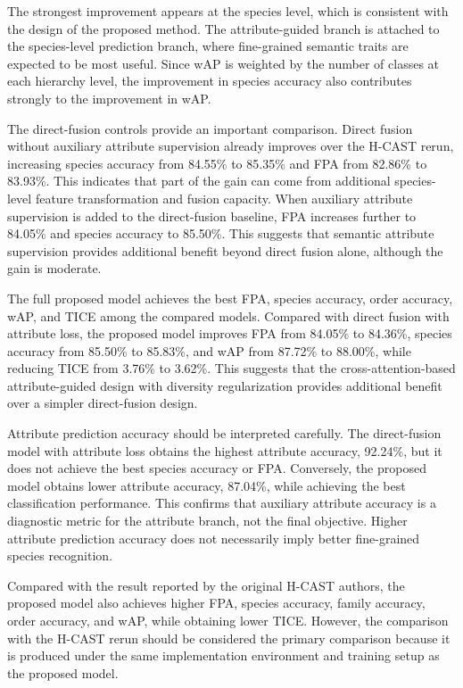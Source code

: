 The strongest improvement appears at the species level, which is consistent with the design of the proposed method. The attribute-guided branch is attached to the species-level prediction branch, where fine-grained semantic traits are expected to be most useful. Since wAP is weighted by the number of classes at each hierarchy level, the improvement in species accuracy also contributes strongly to the improvement in wAP.

The direct-fusion controls provide an important comparison. Direct fusion without auxiliary attribute supervision already improves over the H-CAST rerun, increasing species accuracy from 84.55\% to 85.35\% and FPA from 82.86\% to 83.93\%. This indicates that part of the gain can come from additional species-level feature transformation and fusion capacity. When auxiliary attribute supervision is added to the direct-fusion baseline, FPA increases further to 84.05\% and species accuracy to 85.50\%. This suggests that semantic attribute supervision provides additional benefit beyond direct fusion alone, although the gain is moderate.

The full proposed model achieves the best FPA, species accuracy, order accuracy, wAP, and TICE among the compared models. Compared with direct fusion with attribute loss, the proposed model improves FPA from 84.05\% to 84.36\%, species accuracy from 85.50\% to 85.83\%, and wAP from 87.72\% to 88.00\%, while reducing TICE from 3.76\% to 3.62\%. This suggests that the cross-attention-based attribute-guided design with diversity regularization provides additional benefit over a simpler direct-fusion design.

Attribute prediction accuracy should be interpreted carefully. The direct-fusion model with attribute loss obtains the highest attribute accuracy, 92.24\%, but it does not achieve the best species accuracy or FPA. Conversely, the proposed model obtains lower attribute accuracy, 87.04\%, while achieving the best classification performance. This confirms that auxiliary attribute accuracy is a diagnostic metric for the attribute branch, not the final objective. Higher attribute prediction accuracy does not necessarily imply better fine-grained species recognition.

Compared with the result reported by the original H-CAST authors, the proposed model also achieves higher FPA, species accuracy, family accuracy, order accuracy, and wAP, while obtaining lower TICE. However, the comparison with the H-CAST rerun should be considered the primary comparison because it is produced under the same implementation environment and training setup as the proposed model.

